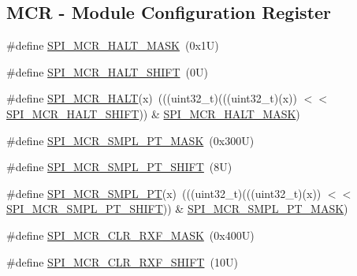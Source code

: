 \subsection*{M\+CR -\/ Module Configuration Register}
\begin{DoxyCompactItemize}
\item 
\#define \mbox{\hyperlink{group___c_a_n___register___masks_ga88c670302548b2d5b5f032b5709bc366}{S\+P\+I\+\_\+\+M\+C\+R\+\_\+\+H\+A\+L\+T\+\_\+\+M\+A\+SK}}~(0x1\+U)
\item 
\#define \mbox{\hyperlink{group___c_a_n___register___masks_ga8f13f49cf8502462271d8a179338d81b}{S\+P\+I\+\_\+\+M\+C\+R\+\_\+\+H\+A\+L\+T\+\_\+\+S\+H\+I\+FT}}~(0\+U)
\item 
\#define \mbox{\hyperlink{group___c_a_n___register___masks_ga615e3c6718820a26ff62dde21b352b27}{S\+P\+I\+\_\+\+M\+C\+R\+\_\+\+H\+A\+LT}}(x)~(((uint32\+\_\+t)(((uint32\+\_\+t)(x)) $<$$<$ \mbox{\hyperlink{group___c_a_n___register___masks_ga8f13f49cf8502462271d8a179338d81b}{S\+P\+I\+\_\+\+M\+C\+R\+\_\+\+H\+A\+L\+T\+\_\+\+S\+H\+I\+FT}})) \& \mbox{\hyperlink{group___c_a_n___register___masks_ga88c670302548b2d5b5f032b5709bc366}{S\+P\+I\+\_\+\+M\+C\+R\+\_\+\+H\+A\+L\+T\+\_\+\+M\+A\+SK}})
\item 
\#define \mbox{\hyperlink{group___c_a_n___register___masks_gaebb0539e04af465a39892f5aaabc872d}{S\+P\+I\+\_\+\+M\+C\+R\+\_\+\+S\+M\+P\+L\+\_\+\+P\+T\+\_\+\+M\+A\+SK}}~(0x300\+U)
\item 
\#define \mbox{\hyperlink{group___c_a_n___register___masks_ga1ffc13b9075cc6b0b34ea3162d6c1b74}{S\+P\+I\+\_\+\+M\+C\+R\+\_\+\+S\+M\+P\+L\+\_\+\+P\+T\+\_\+\+S\+H\+I\+FT}}~(8\+U)
\item 
\#define \mbox{\hyperlink{group___c_a_n___register___masks_ga85a76d4d3ea961f858f6eed9882bfd99}{S\+P\+I\+\_\+\+M\+C\+R\+\_\+\+S\+M\+P\+L\+\_\+\+PT}}(x)~(((uint32\+\_\+t)(((uint32\+\_\+t)(x)) $<$$<$ \mbox{\hyperlink{group___c_a_n___register___masks_ga1ffc13b9075cc6b0b34ea3162d6c1b74}{S\+P\+I\+\_\+\+M\+C\+R\+\_\+\+S\+M\+P\+L\+\_\+\+P\+T\+\_\+\+S\+H\+I\+FT}})) \& \mbox{\hyperlink{group___c_a_n___register___masks_gaebb0539e04af465a39892f5aaabc872d}{S\+P\+I\+\_\+\+M\+C\+R\+\_\+\+S\+M\+P\+L\+\_\+\+P\+T\+\_\+\+M\+A\+SK}})
\item 
\#define \mbox{\hyperlink{group___c_a_n___register___masks_gaedd370380f06f2e4bf2ca01babda8732}{S\+P\+I\+\_\+\+M\+C\+R\+\_\+\+C\+L\+R\+\_\+\+R\+X\+F\+\_\+\+M\+A\+SK}}~(0x400\+U)
\item 
\#define \mbox{\hyperlink{group___c_a_n___register___masks_gae1f4b01eb27f199a893e42f6a3d3edb7}{S\+P\+I\+\_\+\+M\+C\+R\+\_\+\+C\+L\+R\+\_\+\+R\+X\+F\+\_\+\+S\+H\+I\+FT}}~(10\+U)

\end{DoxyCompactItemize}
